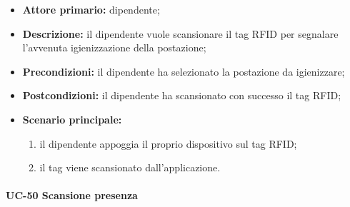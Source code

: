     \begin{itemize}
        \item \textbf{Attore primario:} dipendente;

        \item \textbf{Descrizione:} il dipendente vuole scansionare il tag RFID per segnalare l'avvenuta igienizzazione della postazione;

        \item \textbf{Precondizioni:} il dipendente ha selezionato la postazione da igienizzare;

        \item \textbf{Postcondizioni:} il dipendente ha scansionato con successo il tag RFID;

        \item \textbf{Scenario principale:}
            \begin{enumerate}
                \item il dipendente appoggia il proprio dispositivo sul tag RFID;
                \item il tag viene scansionato dall'applicazione.
            \end{enumerate}
    \end{itemize} 

\paragraph{UC-50 Scansione presenza}

